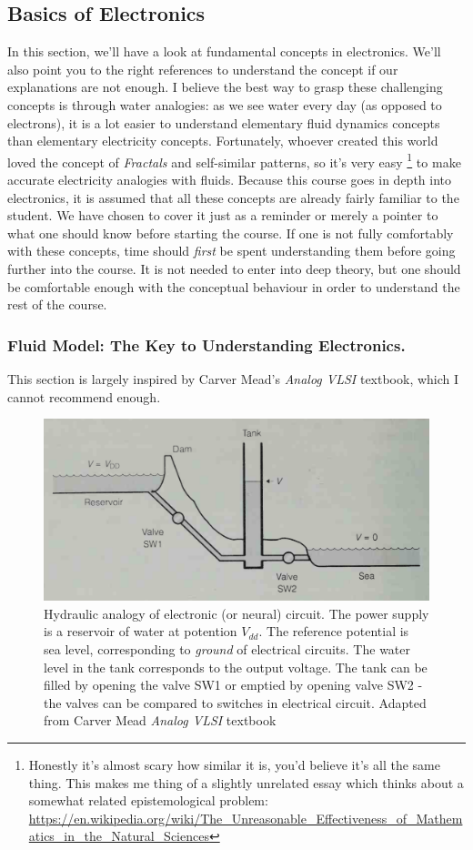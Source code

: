 \subsection{Basics of Electronics}

In this section, we'll have a look at fundamental concepts in electronics.  We'll also point you to the right references to understand the concept if our explanations are not enough. I believe the best way to grasp these challenging concepts is through water analogies: as we see water every day (as opposed to electrons), it is a lot easier to understand elementary fluid dynamics concepts than elementary electricity concepts. Fortunately, whoever created this world loved the concept of \textit{Fractals} and self-similar patterns, so it's very easy \footnote{Honestly it's almost scary how similar it is, you'd believe it's all the same thing. This makes me thing of a slightly unrelated essay which thinks about a somewhat related epistemological problem: \url{https://en.wikipedia.org/wiki/The_Unreasonable\_Effectiveness\_of\_Mathematics\_in\_the\_Natural\_Sciences}} to make accurate electricity analogies with fluids.  
Because this course goes in depth into electronics, it is assumed that all these concepts are already fairly familiar to the student. We have chosen to cover it just as a reminder or merely a pointer to what one should know before starting the course. If one is not fully comfortably with these concepts, time should \textit{first} be spent understanding them before going further into the course. It is not needed to enter into deep theory, but one should be comfortable enough with the conceptual behaviour in order to understand the rest of the course. 

\subsubsection{Fluid Model: The Key to Understanding Electronics.}

This section is largely inspired by Carver Mead's \textit{Analog VLSI} textbook, which I cannot recommend enough. 

\begin{figure}[H]
    \centering
    \includegraphics[width=0.65\linewidth]{../../Figures/Water_Analogies_Carver_Mead.PNG}
    \caption{Hydraulic analogy of electronic (or neural) circuit. The power supply is a reservoir of water at potention $V_{dd}$. The reference potential is sea level, corresponding to \textit{ground} of electrical circuits. The water level in the tank corresponds to the output voltage. The tank can be filled by opening the valve SW1 or emptied by opening valve SW2 - the valves can be compared to switches in electrical circuit. Adapted from Carver Mead \textit{Analog VLSI} textbook}
    \label{fig:Hydraulic Anlogy}
\end{figure}

